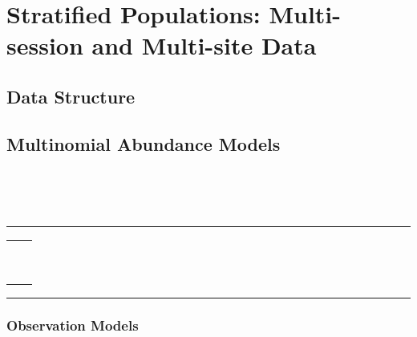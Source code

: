 \chapter{Stratified Populations: 
Multi-session and Multi-site Data}
\label{chapt.hscr}


\section{Data Structure}


\section{Multinomial Abundance Models}

\begin{equation}
\label{eq.poisson1}
\end{equation}

\begin{equation}
\label{eq.poisson2}
\end{equation}


\begin{equation}
\label{eq.mn.N}
\end{equation}


\begin{equation}
\label{eq.mn1}
\end{equation}

\begin{equation}
\label{eq.parm1c}
\end{equation}



\begin{panel}[htp]   
\renewcommand{\baselinestretch}{1.0}
\centering
\rule[0.15in]{\textwidth}{.03in}
\begin{tabular}{cc}
\begin{minipage}{2.75in}
{\small
\begin{verbatim}
\end{verbatim}
}
\end{minipage}
\begin{minipage}{2.75in}
{\small
\begin{verbatim}
\end{verbatim}
}
\end{minipage}
\end{tabular}
\rule[-0.15in]{\textwidth}{.03in}
\label{panel.wbcode}
\end{panel}


\subsection{Observation Models}


